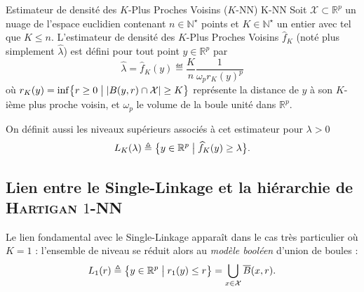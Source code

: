 \begin{Definition}{Estimateur de densité des $K$-Plus Proches Voisins ($K$-NN) \cite{BiauDevroye}}{K-NN}
Soit $\mathcal X \subset \mathbb R^p $ un nuage de l'espace euclidien contenant $n\in \mathbb N^\star$ points et $K \in \mathbb N^\star$ un entier avec tel que $K \le n$. L'estimateur de densité des $K$-Plus Proches Voisins $\widehat f_{K}$ (noté plus simplement $\widehat \lambda$) est défini pour tout point $y \in \mathbb R^p$ par 
\[
\boxed{
    \widehat \lambda = \widehat f_{K}(y) \eqdef \frac{K}{n}  \frac{1}{\omega_p r_K(y)^p} 
}
\]
où $r_K(y) = \inf \bigl\{ r \ge 0 \bigm| \lvert B(y, r) \cap \mathcal X \rvert \ge K \bigr\}$ représente la distance de $y$ à son $K$-ième plus proche voisin, et $\omega_p$ le volume de la boule unité dans $\mathbb R^p$.

On définit aussi les niveaux supérieurs associés à cet estimateur pour $\lambda > 0$
\[
    L_K(\lambda) \triangleq \bigl\{ y \in \mathbb R^p \bigm|  \widehat f_K(y) \ge \lambda \bigr\}.
\]
\end{Definition}




\subsection{Lien entre le Single-Linkage et la hiérarchie de \textsc{Hartigan} $1$-NN}
\label{sec:lien_SL_HartiganNN}

Le lien fondamental avec le Single-Linkage apparaît dans le cas très particulier où $K=1$ : l'ensemble de niveau se réduit alors au \emph{modèle booléen} d'union de boules \cite{MeesterRoy} :
\[
    L_1(r) \triangleq \bigl\{ y \in \mathbb R^p \bigm| r_1(y) \le r \bigr\} = \bigcup_{x \in \mathcal X} \overline{B}(x, r).
\]

